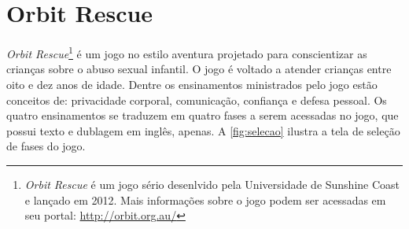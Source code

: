 



\section{Orbit Rescue}\label{sssec:Orbit}


\textit{Orbit Rescue}\footnote{\textit{Orbit Rescue} é um jogo sério desenlvido pela Universidade de Sunshine Coast e lançado em 2012. Mais informações sobre o jogo podem ser acessadas em seu portal: \url{http://orbit.org.au/}} é um jogo no estilo aventura projetado para conscientizar as crianças sobre o abuso sexual infantil. O jogo é voltado a atender crianças entre oito e dez anos de idade. Dentre os ensinamentos ministrados pelo jogo estão conceitos de: privacidade corporal, comunicação, confiança e defesa pessoal. Os quatro ensinamentos se traduzem em quatro fases a serem acessadas no jogo, que possui texto e dublagem em inglês, apenas. A \autoref{fig:selecao} ilustra a tela de seleção de fases do jogo.

